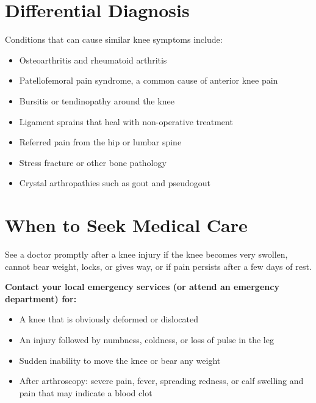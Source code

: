\section*{Differential Diagnosis}
Conditions that can cause similar knee symptoms include:
\begin{itemize}
    \item Osteoarthritis and rheumatoid arthritis
    \item Patellofemoral pain syndrome, a common cause of anterior knee pain
    \item Bursitis or tendinopathy around the knee
    \item Ligament sprains that heal with non-operative treatment
    \item Referred pain from the hip or lumbar spine
    \item Stress fracture or other bone pathology
    \item Crystal arthropathies such as gout and pseudogout
\end{itemize}

\section*{When to Seek Medical Care}
See a doctor promptly after a knee injury if the knee becomes very swollen, cannot bear weight, locks, or gives way, or if pain persists after a few days of rest.

\textbf{Contact your local emergency services (or attend an emergency department) for:}
\begin{itemize}
    \item A knee that is obviously deformed or dislocated
    \item An injury followed by numbness, coldness, or loss of pulse in the leg
    \item Sudden inability to move the knee or bear any weight
    \item After arthroscopy: severe pain, fever, spreading redness, or calf swelling and pain that may indicate a blood clot
\end{itemize}

